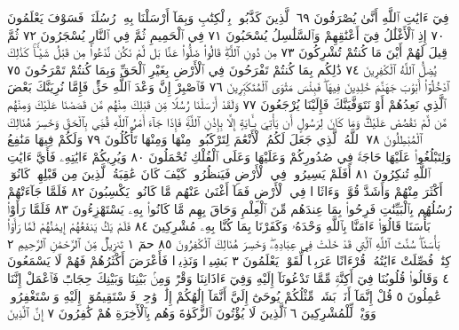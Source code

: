 فِيٓ ءَايَٰتِ ٱللَّهِ أَنَّىٰ يُصْرَفُونَ ٦٩ ٱلَّذِينَ كَذَّبُوا۟ بِٱلْكِتَٰبِ
وَبِمَآ أَرْسَلْنَا بِهِۦ رُسُلَنَاۖ فَسَوْفَ يَعْلَمُونَ ٧٠ إِذِ ٱلْأَغْلَٰلُ
فِيٓ أَعْنَٰقِهِمْ وَٱلسَّلَٰسِلُ يُسْحَبُونَ ٧١ فِي ٱلْحَمِيمِ
ثُمَّ فِي ٱلنَّارِ يُسْجَرُونَ ٧٢ ثُمَّ قِيلَ لَهُمْ أَيْنَ مَا كُنتُمْ
تُشْرِكُونَ ٧٣ مِن دُونِ ٱللَّهِۖ قَالُوا۟ ضَلُّوا۟ عَنَّا بَل لَّمْ نَكُن
نَّدْعُوا۟ مِن قَبْلُ شَيْـࣰٔاۚ كَذَٰلِكَ يُضِلُّ ٱللَّهُ ٱلْكَٰفِرِينَ ٧٤
ذَٰلِكُم بِمَا كُنتُمْ تَفْرَحُونَ فِي ٱلْأَرْضِ بِغَيْرِ ٱلْحَقِّ وَبِمَا كُنتُمْ
تَمْرَحُونَ ٧٥ ٱدْخُلُوٓا۟ أَبْوَٰبَ جَهَنَّمَ خَٰلِدِينَ فِيهَاۖ فَبِئْسَ مَثْوَى
ٱلْمُتَكَبِّرِينَ ٧٦ فَٱصْبِرْ إِنَّ وَعْدَ ٱللَّهِ حَقࣱّۚ فَإِمَّا نُرِيَنَّكَ
بَعْضَ ٱلَّذِي نَعِدُهُمْ أَوْ نَتَوَفَّيَنَّكَ فَإِلَيْنَا يُرْجَعُونَ ٧٧
وَلَقَدْ أَرْسَلْنَا رُسُلࣰا مِّن قَبْلِكَ مِنْهُم مَّن قَصَصْنَا عَلَيْكَ
وَمِنْهُم مَّن لَّمْ نَقْصُصْ عَلَيْكَۗ وَمَا كَانَ لِرَسُولٍ أَن يَأْتِيَ
بِـَٔايَةٍ إِلَّا بِإِذْنِ ٱللَّهِۚ فَإِذَا جَآءَ أَمْرُ ٱللَّهِ قُضِيَ بِٱلْحَقِّ وَخَسِرَ
هُنَالِكَ ٱلْمُبْطِلُونَ ٧٨ ٱللَّهُ ٱلَّذِي جَعَلَ لَكُمُ ٱلْأَنْعَٰمَ
لِتَرْكَبُوا۟ مِنْهَا وَمِنْهَا تَأْكُلُونَ ٧٩ وَلَكُمْ فِيهَا مَنَٰفِعُ
وَلِتَبْلُغُوا۟ عَلَيْهَا حَاجَةࣰ فِي صُدُورِكُمْ وَعَلَيْهَا وَعَلَى
ٱلْفُلْكِ تُحْمَلُونَ ٨٠ وَيُرِيكُمْ ءَايَٰتِهِۦ فَأَيَّ ءَايَٰتِ ٱللَّهِ
تُنكِرُونَ ٨١ أَفَلَمْ يَسِيرُوا۟ فِي ٱلْأَرْضِ فَيَنظُرُوا۟ كَيْفَ
كَانَ عَٰقِبَةُ ٱلَّذِينَ مِن قَبْلِهِمْۚ كَانُوٓا۟ أَكْثَرَ مِنْهُمْ وَأَشَدَّ
قُوَّةࣰ وَءَاثَارࣰا فِي ٱلْأَرْضِ فَمَآ أَغْنَىٰ عَنْهُم مَّا كَانُوا۟ يَكْسِبُونَ ٨٢
فَلَمَّا جَآءَتْهُمْ رُسُلُهُم بِٱلْبَيِّنَٰتِ فَرِحُوا۟ بِمَا عِندَهُم مِّنَ
ٱلْعِلْمِ وَحَاقَ بِهِم مَّا كَانُوا۟ بِهِۦ يَسْتَهْزِءُونَ ٨٣ فَلَمَّا رَأَوْا۟
بَأْسَنَا قَالُوٓا۟ ءَامَنَّا بِٱللَّهِ وَحْدَهُۥ وَكَفَرْنَا بِمَا كُنَّا بِهِۦ
مُشْرِكِينَ ٨٤ فَلَمْ يَكُ يَنفَعُهُمْ إِيمَٰنُهُمْ لَمَّا رَأَوْا۟ بَأْسَنَاۖ سُنَّتَ
ٱللَّهِ ٱلَّتِي قَدْ خَلَتْ فِي عِبَادِهِۦۖ وَخَسِرَ هُنَالِكَ ٱلْكَٰفِرُونَ ٨٥
حمٓ ١ تَنزِيلࣱ مِّنَ ٱلرَّحْمَٰنِ ٱلرَّحِيمِ ٢ كِتَٰبࣱ فُصِّلَتْ ءَايَٰتُهُۥ
قُرْءَانًا عَرَبِيࣰّا لِّقَوْمࣲ يَعْلَمُونَ ٣ بَشِيرࣰا وَنَذِيرࣰا فَأَعْرَضَ أَكْثَرُهُمْ
فَهُمْ لَا يَسْمَعُونَ ٤ وَقَالُوا۟ قُلُوبُنَا فِيٓ أَكِنَّةࣲ مِّمَّا تَدْعُونَآ إِلَيْهِ وَفِيٓ
ءَاذَانِنَا وَقْرࣱ وَمِنۢ بَيْنِنَا وَبَيْنِكَ حِجَابࣱ فَٱعْمَلْ إِنَّنَا عَٰمِلُونَ ٥
قُلْ إِنَّمَآ أَنَا۠ بَشَرࣱ مِّثْلُكُمْ يُوحَىٰٓ إِلَيَّ أَنَّمَآ إِلَٰهُكُمْ إِلَٰهࣱ وَٰحِدࣱ
فَٱسْتَقِيمُوٓا۟ إِلَيْهِ وَٱسْتَغْفِرُوهُۗ وَوَيْلࣱ لِّلْمُشْرِكِينَ ٦ ٱلَّذِينَ
لَا يُؤْتُونَ ٱلزَّكَوٰةَ وَهُم بِٱلْأٓخِرَةِ هُمْ كَٰفِرُونَ ٧ إِنَّ ٱلَّذِينَ
